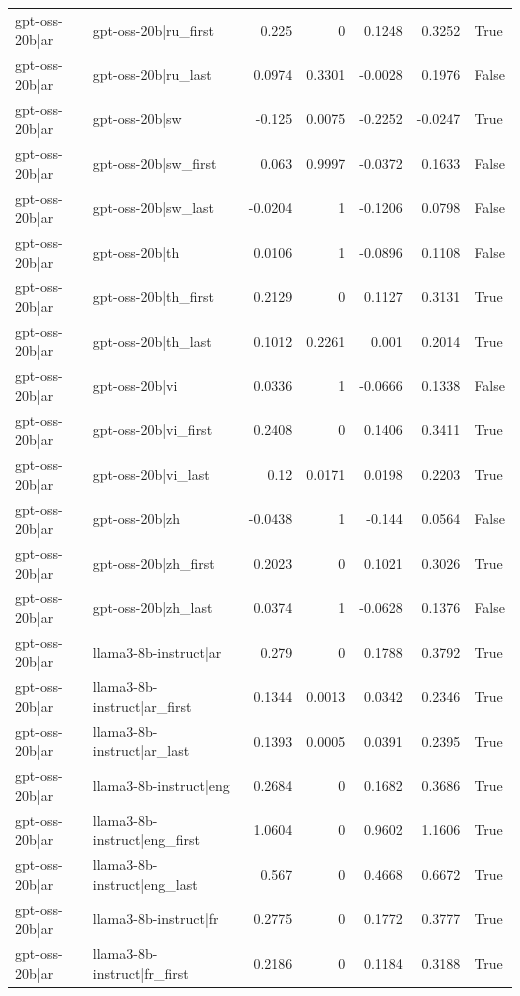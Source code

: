 \begin{table}
\begin{tabular}{l l r r r r l}
gpt-oss-20b|ar & gpt-oss-20b|ru_first & 0.225 & 0 & 0.1248 & 0.3252 & True \\
gpt-oss-20b|ar & gpt-oss-20b|ru_last & 0.0974 & 0.3301 & -0.0028 & 0.1976 & False \\
gpt-oss-20b|ar & gpt-oss-20b|sw & -0.125 & 0.0075 & -0.2252 & -0.0247 & True \\
gpt-oss-20b|ar & gpt-oss-20b|sw_first & 0.063 & 0.9997 & -0.0372 & 0.1633 & False \\
gpt-oss-20b|ar & gpt-oss-20b|sw_last & -0.0204 & 1 & -0.1206 & 0.0798 & False \\
gpt-oss-20b|ar & gpt-oss-20b|th & 0.0106 & 1 & -0.0896 & 0.1108 & False \\
gpt-oss-20b|ar & gpt-oss-20b|th_first & 0.2129 & 0 & 0.1127 & 0.3131 & True \\
gpt-oss-20b|ar & gpt-oss-20b|th_last & 0.1012 & 0.2261 & 0.001 & 0.2014 & True \\
gpt-oss-20b|ar & gpt-oss-20b|vi & 0.0336 & 1 & -0.0666 & 0.1338 & False \\
gpt-oss-20b|ar & gpt-oss-20b|vi_first & 0.2408 & 0 & 0.1406 & 0.3411 & True \\
gpt-oss-20b|ar & gpt-oss-20b|vi_last & 0.12 & 0.0171 & 0.0198 & 0.2203 & True \\
gpt-oss-20b|ar & gpt-oss-20b|zh & -0.0438 & 1 & -0.144 & 0.0564 & False \\
gpt-oss-20b|ar & gpt-oss-20b|zh_first & 0.2023 & 0 & 0.1021 & 0.3026 & True \\
gpt-oss-20b|ar & gpt-oss-20b|zh_last & 0.0374 & 1 & -0.0628 & 0.1376 & False \\
gpt-oss-20b|ar & llama3-8b-instruct|ar & 0.279 & 0 & 0.1788 & 0.3792 & True \\
gpt-oss-20b|ar & llama3-8b-instruct|ar_first & 0.1344 & 0.0013 & 0.0342 & 0.2346 & True \\
gpt-oss-20b|ar & llama3-8b-instruct|ar_last & 0.1393 & 0.0005 & 0.0391 & 0.2395 & True \\
gpt-oss-20b|ar & llama3-8b-instruct|eng & 0.2684 & 0 & 0.1682 & 0.3686 & True \\
gpt-oss-20b|ar & llama3-8b-instruct|eng_first & 1.0604 & 0 & 0.9602 & 1.1606 & True \\
gpt-oss-20b|ar & llama3-8b-instruct|eng_last & 0.567 & 0 & 0.4668 & 0.6672 & True \\
gpt-oss-20b|ar & llama3-8b-instruct|fr & 0.2775 & 0 & 0.1772 & 0.3777 & True \\
gpt-oss-20b|ar & llama3-8b-instruct|fr_first & 0.2186 & 0 & 0.1184 & 0.3188 & True \\

\end{tabular}
\end{table}
